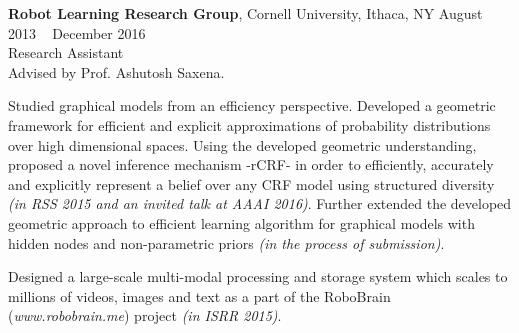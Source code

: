    \textbf{Robot Learning Research Group}, Cornell University, Ithaca, NY \hfill August 2013 \textendash ~ December 2016\vspace{0mm}\\\vspace{0mm}
    \hspace{-1mm}Research Assistant  \hfill \vspace{1.5mm} \\
  Advised by Prof. Ashutosh Saxena.

Studied graphical models from an efficiency perspective. Developed a geometric framework for efficient and explicit approximations of probability distributions over high dimensional spaces. Using the developed geometric understanding, proposed a novel inference mechanism -rCRF- in order to efficiently, accurately and explicitly represent a belief over any CRF model using structured diversity \emph{(in RSS 2015 and an invited talk at AAAI 2016)}. Further extended the developed geometric approach to efficient learning algorithm for graphical models with hidden nodes and non-parametric priors \emph{(in the process of submission)}.

Designed a large-scale multi-modal processing and storage system which scales to millions of videos, images and text as a part of the RoboBrain (\emph{www.robobrain.me}) project \emph{(in ISRR 2015)}.
